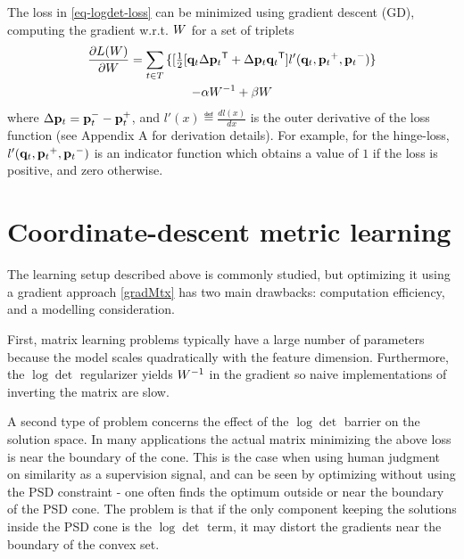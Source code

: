 \documentclass{article}
\begin{document}
The loss in \eqref{eq-logdet-loss} can be minimized using gradient descent (GD), computing the gradient w.r.t. ${W}$ for a set of triplets
\begin{multline}
  \frac{\partial {L ({W})}}{\partial {W}} = \sum\limits_{t\in T}{\{
  [\tfrac{1}{2}[{\mathbf{q}}_{t}\Delta{\mathbf{p}}_{t}{}^\mathsf{T} + \Delta{\mathbf{p}}_{t}{\mathbf{q}}_{t}{}^\mathsf{T}]  }
  {l'}({{\mathbf{q}}_{{t}}}, {{\mathbf{p}}_{{t}}}^{+}, {{\mathbf{p}}_{{t}}}^{-})\} \\- \alpha {W}^{-1} + \beta {W}
  \label{gradMtx}
\end{multline}
where $\Delta{\mathbf{p}}_t = {\mathbf{p}}_t^- - {\mathbf{p}}_t^+$, and $l'(x) \eqdef \frac{d{l(x)}}{dx}$ is the outer derivative of the loss function (see Appendix A for derivation details). For example, for the hinge-loss, 
$l'({{\mathbf{q}}_{{t}}}, {{\mathbf{p}}_{{t}}}^{+}, {{\mathbf{p}}_{{t}}}^{-})$ 
is an indicator function which obtains a value of $1$ if the loss is positive, and zero otherwise.


\section{Coordinate-descent metric learning}

The learning setup described above is commonly studied, but 
optimizing it using a gradient approach \eqref{gradMtx} has two main drawbacks: computation efficiency, and a modelling consideration.

First, matrix learning problems typically have a large number of parameters because the model scales quadratically with the feature dimension. %
Furthermore, the $\log \det$ regularizer yields  ${W}^{-1}$ in the gradient so naive implementations of inverting the matrix are slow.

A second type of problem concerns the effect of the $\log \det$ barrier on the solution space. In many applications the actual matrix minimizing the above loss is near the boundary of the cone. This is the case when using human judgment on similarity as a supervision signal, and can be seen by optimizing without using the PSD constraint - one often finds the optimum outside or near the boundary of the PSD cone.
The problem is that if the only component keeping the solutions inside the PSD cone is the $\log \det$ term, it may distort the gradients near the boundary of the convex set. 
\end{document}

